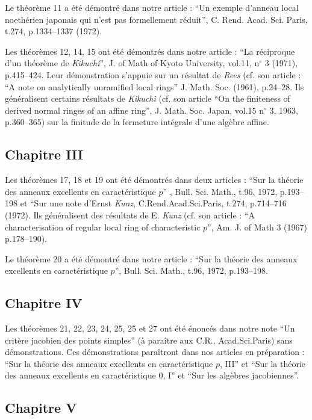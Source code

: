 {Le théorème 11 a été démontré dans notre article : ``Un exemple d’anneau local noethérien japonais qui n’est pas formellement réduit'', C. Rend. Acad. Sci. Paris, t.274, p.1334--1337 (1972).

Les théorèmes 12, 14, 15 ont été démontrés dans notre article : ``La réciproque d’un théorème de \emph{Kikuchi}'', J. of Math of Kyoto University, vol.11, n$^\circ$ 3 (1971), p.415--424. Leur démonstration s’appuie sur un résultat de \emph{Rees} (cf. son article : ``A note on analytically unramified local rings'' J. Math. Soc. (1961), p.24--28. Ils généralisent certains résultats de \emph{Kikuchi} (cf. son article ``On the finiteness of derived normal ringes of an affine ring'', J. Math. Soc. Japan, vol.15 n$^\circ$ 3, 1963, p.360--365) sur la finitude de la fermeture intégrale d’une algèbre affine.

\subsection*{Chapitre III}

Les théorèmes 17, 18 et 19 ont été démontrés dans deux articles : ``Sur la théorie des anneaux excellents en caractéristique $p$'' , Bull. Sci. Math., t.96, 1972, p.193--198 et ``Sur une note d’Ernst \emph{Kunz}, C.Rend.Acad.Sci.Paris, t.274, p.714--716 (1972). Ils généralisent des résultats de E. \emph{Kunz} (cf. son article : ``A characterisation of regular local ring of characteristic $p$'', Am. J. of Math 3 (1967) p.178--190).

Le théorème 20 a été démontré dans notre article : ``Sur la théorie des anneaux excellents en caractéristique $p$'', Bull. Sci. Math., t.96, 1972, p.193--198.

\subsection*{Chapitre IV}

Les théorèmes 21, 22, 23, 24, 25, 25 et 27 ont été énoncés dans notre note ``Un critère jacobien des points simples'' (à paraître aux C.R., Acad.Sci.Paris) sans démonstrations. Ces démonstrations paraîtront dans nos articles en préparation : ``Sur la théorie des anneaux excellents en caractéristique $p$, III'' et ``Sur la théorie des anneaux excellents en caractéristique $0$, I'' et ``Sur les algèbres jacobiennes''.

\subsection*{Chapitre V}

}
